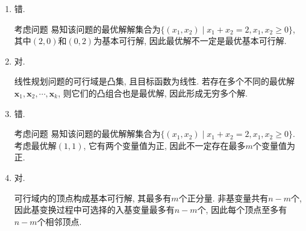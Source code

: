 \begin{enumerate}[label=\alph*)]
    \item
        错.

        考虑问题
        易知该问题的最优解解集合为$\{(x_1,x_2) \mid x_1+x_2=2, x_1,x_2\geq0\}$, 其中$(2,0)$和$(0,2)$为基本可行解, 因此最优解不一定是最优基本可行解.

    \item
        对.

        线性规划问题的可行域是凸集, 且目标函数为线性. 若存在多个不同的最优解$\bm{x}_1,\bm{x}_2,\cdots,\bm{x}_{k}$, 则它们的凸组合也是最优解, 因此形成无穷多个解.

    \item
        错.

        考虑问题
        易知该问题的最优解解集合为$\{(x_1,x_2) \mid x_1+x_2=2, x_1,x_2\geq0\}$.
        考虑最优解$(1,1)$, 它有两个变量值为正, 因此不一定存在最多$m$个变量值为正.

    \item
        对.

        可行域内的顶点构成基本可行解, 其最多有$m$个正分量.
        非基变量共有$n-m$个, 因此基变换过程中可选择的入基变量最多有$n-m$个, 因此每个顶点至多有$n-m$个相邻顶点.
\end{enumerate}
